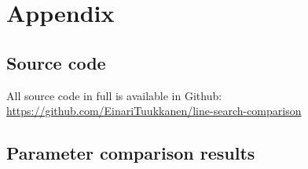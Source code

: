 \documentclass[english, 12pt, a4paper, sci, utf8, a-1b, online, table]{aaltothesis}
\begin{document}
\newpage
% 






\newpage
\appendix
\section{Appendix}
\label{sect:appendix}

\subsection{Source code}
All source code in full is available in Github: \\
\url{https://github.com/EinariTuukkanen/line-search-comparison}

\subsection{Parameter comparison results}

\end{document}
